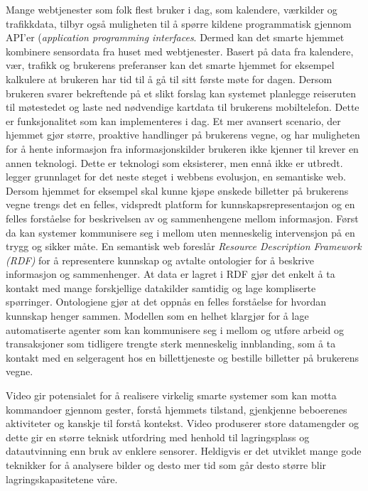 {Mange webtjenester som folk flest bruker i dag, som kalendere, værkilder og trafikkdata, tilbyr også muligheten til å spørre kildene programmatisk gjennom API'er (\emph{application programming interfaces}. Dermed kan det smarte hjemmet kombinere sensordata fra huset med webtjenester. Basert på data fra kalendere, vær, trafikk og brukerens preferanser kan det smarte hjemmet for eksempel kalkulere at brukeren har tid til å gå til sitt første møte for dagen. Dersom brukeren svarer bekreftende på et slikt forslag kan systemet planlegge reiseruten til møtestedet og laste ned nødvendige kartdata til brukerens mobiltelefon. Dette er funksjonalitet som kan implementeres i dag. Et mer avansert scenario, der hjemmet gjør større, proaktive handlinger på brukerens vegne, og har muligheten for å hente informasjon fra informasjonskilder brukeren ikke kjenner til krever en annen teknologi. Dette er teknologi som eksisterer, men ennå ikke er utbredt. \citet{semantic01} legger grunnlaget for det neste steget i webbens evolusjon, en semantiske web. Dersom hjemmet for eksempel skal kunne kjøpe ønskede billetter på brukerens vegne trengs det en felles, vidspredt platform for kunnskapsrepresentasjon og en felles forståelse for beskrivelsen av og sammenhengene mellom informasjon. Først da kan systemer kommunisere seg i mellom uten menneskelig intervensjon på en trygg og sikker måte. En semantisk web foreslår \emph{Resource Description Framework (RDF)} for å representere kunnskap og avtalte ontologier for å beskrive informasjon og sammenhenger. At data er lagret i RDF gjør det enkelt å ta kontakt med mange forskjellige datakilder samtidig og lage kompliserte spørringer. Ontologiene gjør at det oppnås en felles forståelse for hvordan kunnskap henger sammen. Modellen som en helhet klargjør for å lage automatiserte agenter som kan kommunisere seg i mellom og utføre arbeid og transaksjoner som tidligere trengte sterk menneskelig innblanding, som å ta kontakt med en selgeragent hos en billettjeneste og bestille billetter på brukerens vegne.

Video gir potensialet for å realisere virkelig smarte systemer som kan motta kommandoer gjennom gester, forstå hjemmets tilstand, gjenkjenne beboerenes aktiviteter og kanskje til forstå kontekst. Video produserer store datamengder og dette gir en større teknisk utfordring med henhold til lagringsplass og datautvinning enn bruk av enklere sensorer. Heldigvis er det utviklet mange gode teknikker for å analysere bilder og desto mer tid som går desto større blir lagringskapasitetene våre.

}

